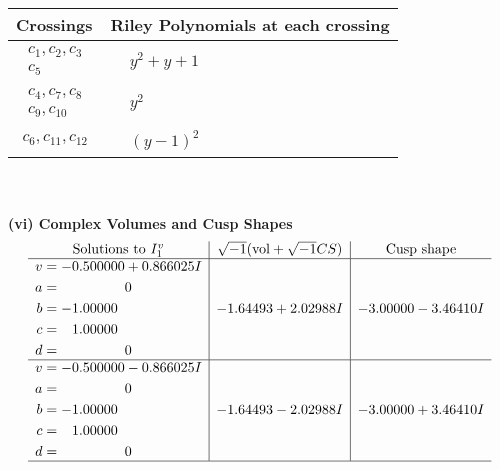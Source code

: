 \documentclass[1p]{elsarticle_modified}
\theoremstyle{definition}
\newcommand{\I}{\sqrt{-1}}
\begin{document}
\begin{tabular}{m{50pt}|m{274pt}}
Crossings & \hspace{64pt}Riley Polynomials at each crossing \\
\hline $$\begin{aligned}c_{1},c_{2},c_{3}\\c_{5}\end{aligned}$$&$\begin{aligned}
&y^2+y+1
\end{aligned}$\\
\hline $$\begin{aligned}c_{4},c_{7},c_{8}\\c_{9},c_{10}\end{aligned}$$&$\begin{aligned}
&y^2
\end{aligned}$\\
\hline $$\begin{aligned}c_{6},c_{11},c_{12}\end{aligned}$$&$\begin{aligned}
&(y-1)^2
\end{aligned}$\\
\hline
\end{tabular}\\~\\
\newpage\flushleft \textbf{(vi) Complex Volumes and Cusp Shapes}
$$\begin{array}{c|c|c}  
\text{Solutions to }I^v_{1}& \I (\text{vol} + \sqrt{-1}CS) & \text{Cusp shape}\\
 \hline 
\begin{aligned}
v &= -0.500000 + 0.866025 I \\
a &= \phantom{-0.000000 } 0 \\
b &= -1.00000\phantom{ +0.000000I} \\
c &= \phantom{-}1.00000\phantom{ +0.000000I} \\
d &= \phantom{-0.000000 } 0\end{aligned}
 & -1.64493 + 2.02988 I & -3.00000 - 3.46410 I \\ \hline\begin{aligned}
v &= -0.500000 - 0.866025 I \\
a &= \phantom{-0.000000 } 0 \\
b &= -1.00000\phantom{ +0.000000I} \\
c &= \phantom{-}1.00000\phantom{ +0.000000I} \\
d &= \phantom{-0.000000 } 0\end{aligned}
 & -1.64493 - 2.02988 I & -3.00000 + 3.46410 I\\
 \hline 
 \end{array}$$\newpage\newpage\renewcommand{\arraystretch}{1}
\end{document}

